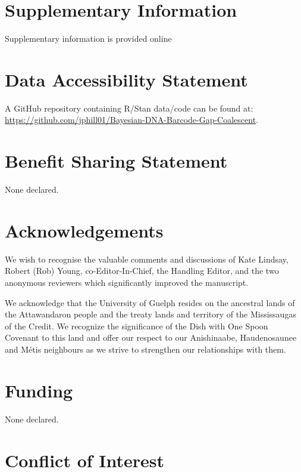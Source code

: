 \documentclass[12pt]{article}
\begin{document}
\newpage

\section*{Supplementary Information}

Supplementary information is provided online

\section*{Data Accessibility Statement}

A GitHub repository containing R/Stan data/code can be found at: \\ \href{https://github.com/jphill01/Bayesian-DNA-Barcode-Gap-Coalescent}{https://github.com/jphill01/Bayesian-DNA-Barcode-Gap-Coalescent}.

\section*{Benefit Sharing Statement}

None declared.

\section*{Acknowledgements}

We wish to recognise the valuable comments and discussions of Kate Lindsay, Robert (Rob) Young, co-Editor-In-Chief, the Handling Editor, and the two anonymous reviewers which significantly improved the manuscript.

We acknowledge that the University of Guelph resides on the ancestral lands of the Attawandaron people and the treaty lands and territory of the Mississaugas of the Credit. We recognize the significance of the Dish with One Spoon Covenant to this land and offer our respect to our Anishinaabe, Haudenosaunee and M{\'e}tis neighbours as we strive to strengthen our relationships with them.

\section*{Funding}

None declared.

\section*{Conflict of Interest}
\end{document}
